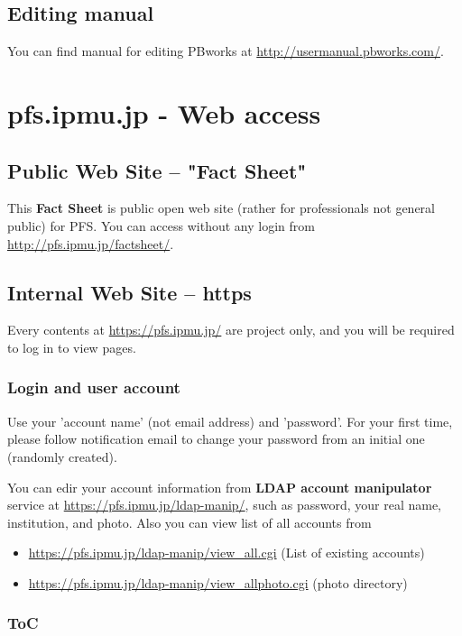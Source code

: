 \documentclass[a4paper,notitlepage]{article}
\begin{document}
\subsection{Editing manual}

You can find manual for editing PBworks at 
\url{http://usermanual.pbworks.com/}. 


\section{pfs.ipmu.jp - Web access}

\subsection{Public Web Site -- "Fact Sheet"}

This {\bf Fact Sheet} is public open web site (rather for professionals 
not general public) for PFS. 
You can access without any login from \url{http://pfs.ipmu.jp/factsheet/}.

\subsection{Internal Web Site -- https}

Every contents at \url{https://pfs.ipmu.jp/} are project only, and you will 
be required to log in to view pages. 

\subsubsection{Login and user account}

Use your 'account name' (not email address) and 'password'.
For your first time, please follow notification email to change your password 
from an initial one (randomly created). 

You can edir your account information from {\bf LDAP account manipulator} 
service at \url{https://pfs.ipmu.jp/ldap-manip/}, 
such as password, your real name, institution, and photo. 
Also you can view list of all accounts from 

\begin{itemize}
  \item \url{https://pfs.ipmu.jp/ldap-manip/view_all.cgi} (List of existing accounts)
  \item \url{https://pfs.ipmu.jp/ldap-manip/view_allphoto.cgi} (photo directory)
\end{itemize}

\subsubsection{ToC}
\end{document}

